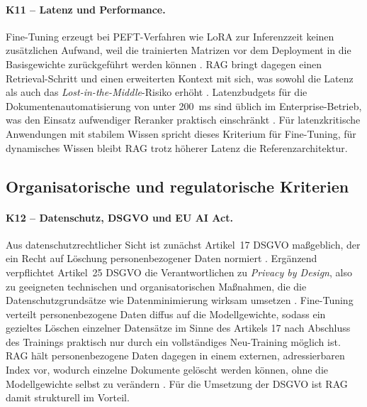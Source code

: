 \paragraph{K11 -- Latenz und Performance.}\label{krit:k11}
Fine-Tuning erzeugt bei PEFT-Verfahren wie LoRA zur Inferenzzeit keinen zusätzlichen Aufwand, weil die trainierten Matrizen vor dem Deployment in die Basisgewichte zurückgeführt werden können \autocite[4]{Hu.2022}.
RAG bringt dagegen einen Retrieval-Schritt und einen erweiterten Kontext mit sich, was sowohl die Latenz als auch das \textit{Lost-in-the-Middle}-Risiko erhöht \autocite[10]{Gao.2024}.
Latenzbudgets für die Dokumentenautomatisierung von unter 200~ms sind üblich im Enterprise-Betrieb, was den Einsatz aufwendiger Reranker praktisch einschränkt \autocite[20]{Karakurt.2026}.
Für latenzkritische Anwendungen mit stabilem Wissen spricht dieses Kriterium für Fine-Tuning, für dynamisches Wissen bleibt RAG trotz höherer Latenz die Referenzarchitektur.

\subsection{Organisatorische und regulatorische Kriterien}
\label{sec:krit-regulatorisch}

\paragraph{K12 -- Datenschutz, DSGVO und EU AI Act.}\label{krit:k12}
Aus datenschutzrechtlicher Sicht ist zunächst Artikel~17 DSGVO maßgeblich, der ein Recht auf Löschung personenbezogener Daten normiert \autocite[Art.~17]{EuropaischesParlamentundRat.2016}. Ergänzend verpflichtet Artikel~25 DSGVO die Verantwortlichen zu \textit{Privacy by Design}, also zu geeigneten technischen und organisatorischen Maßnahmen, die die Datenschutzgrundsätze wie Datenminimierung wirksam umsetzen \autocite[Art.~25]{EuropaischesParlamentundRat.2016}.
Fine-Tuning verteilt personenbezogene Daten diffus auf die Modellgewichte, sodass ein gezieltes Löschen einzelner Datensätze im Sinne des Artikels 17 nach Abschluss des Trainings praktisch nur durch ein vollständiges Neu-Training möglich ist. RAG hält personenbezogene Daten dagegen in einem externen, adressierbaren Index vor, wodurch einzelne Dokumente gelöscht werden können, ohne die Modellgewichte selbst zu verändern \autocite[7]{Lewis.2020}. Für die Umsetzung der DSGVO ist RAG damit strukturell im Vorteil.

